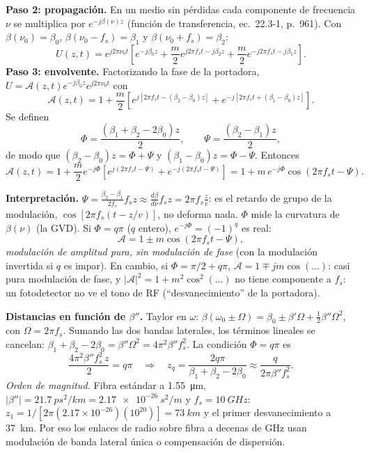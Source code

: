 \textbf{Paso 2: propagación.} En un medio sin pérdidas cada componente de frecuencia $\nu$ se multiplica
por $e^{-j\beta(\nu)z}$ (función de transferencia, ec.~22.3-1, p.~961). Con $\beta(\nu_0)=\beta_0$,
$\beta(\nu_0-f_s)=\beta_1$ y $\beta(\nu_0+f_s)=\beta_2$:
\[
U(z,t)=e^{j2\pi\nu_0t}\left[e^{-j\beta_0z}+\frac m2e^{j2\pi f_st-j\beta_2z}+\frac m2e^{-j2\pi f_st-j\beta_1z}\right].
\]
\textbf{Paso 3: envolvente.} Factorizando la fase de la portadora, $U=\mathcal A(z,t)e^{-j\beta_0z}e^{j2\pi\nu_0t}$ con
\[
\mathcal A(z,t)=1+\frac m2\left[e^{j[2\pi f_st-(\beta_2-\beta_0)z]}+e^{-j[2\pi f_st+(\beta_1-\beta_0)z]}\right].
\]
Se definen
\[
\Phi=\frac{(\beta_1+\beta_2-2\beta_0)z}{2},\qquad \Psi=\frac{(\beta_2-\beta_1)z}{2},
\]
de modo que $(\beta_2-\beta_0)z=\Phi+\Psi$ y $(\beta_1-\beta_0)z=\Phi-\Psi$. Entonces
\[
\mathcal A(z,t)=1+\frac m2e^{-j\Phi}\left[e^{j(2\pi f_st-\Psi)}+e^{-j(2\pi f_st-\Psi)}\right]
=1+m\,e^{-j\Phi}\cos(2\pi f_st-\Psi).
\]

\textbf{Interpretación.} $\Psi=\frac{\beta_2-\beta_1}{2f_s}f_sz\approx\frac{d\beta}{d\nu}f_sz=2\pi f_s\frac{z}{v}$:
es el retardo de grupo de la modulación, $\cos[2\pi f_s(t-z/v)]$, no deforma nada. $\Phi$ mide la
curvatura de $\beta(\nu)$ (la GVD). Si $\Phi=q\pi$ ($q$ entero), $e^{-j\Phi}=(-1)^q$ es real:
\[
\mathcal A=1\pm m\cos(2\pi f_st-\Psi),
\]
\emph{modulación de amplitud pura, sin modulación de fase} (con la modulación invertida si $q$ es impar).
En cambio, si $\Phi=\pi/2+q\pi$, $\mathcal A=1\mp jm\cos(\ldots)$: casi pura modulación de fase, y
$|\mathcal A|^2=1+m^2\cos^2(\ldots)$ no tiene componente a $f_s$: un fotodetector no ve el tono de RF
(``desvanecimiento'' de la portadora).

\textbf{Distancias en función de $\beta''$.} Taylor en $\omega$: $\beta(\omega_0\pm\Omega)=\beta_0\pm\beta'\Omega+\tfrac12\beta''\Omega^2$,
con $\Omega=2\pi f_s$. Sumando las dos bandas laterales, los términos lineales se cancelan:
$\beta_1+\beta_2-2\beta_0=\beta''\Omega^2=4\pi^2\beta''f_s^2$. La condición $\Phi=q\pi$ es
\[
\frac{4\pi^2\beta''f_s^2\,z}{2}=q\pi
\quad\Longrightarrow\quad
z_q=\frac{2q\pi}{\beta_1+\beta_2-2\beta_0}\approx\frac{q}{2\pi\beta''f_s^2}.
\]
\emph{Orden de magnitud.} Fibra estándar a \SI{1.55}{\um}, $|\beta''|=\SI{21.7}{ps^2/km}=\SI{2.17e-26}{s^2/m}$
y $f_s=\SI{10}{GHz}$: $z_1=1/[2\pi(2.17\times10^{-26})(10^{20})]=\SI{73}{km}$ y el primer desvanecimiento a
\SI{37}{km}. Por eso los enlaces de radio sobre fibra a decenas de GHz usan modulación de banda lateral
única o compensación de dispersión.

